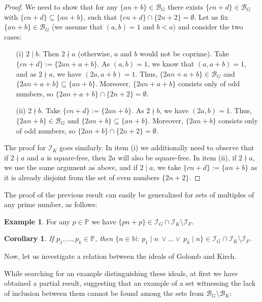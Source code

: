 \documentclass{amsart}
\newtheorem{cor}[thm]{Corollary}
\theoremstyle{definition}
\newtheorem{ex}[thm]{Example}
\newcommand{\N}{{\mathbb N}}
\newcommand{\I}{\mathcal I}
\newcommand{\B}{\mathcal{B}}
\begin{document}
\begin{proof}
We need to show that for any $\{an+b\} \in \B_G$ there exists $\{cn+d\} \in \B_G$ with $\{cn+d\} \subseteq \{an+b\}$, such that $\{cn+d\}\cap \{2n+2\} = \emptyset$. Let us fix $\{an+b\} \in \B_G$ (we assume that $(a,b)=1$ and $b<a$) and consider the two cases:
\begin{itemize}
 \item[(i)] $2\mid b$. Then $2 \nmid a$ (otherwise, $a$ and $b$ would not be coprime). Take $\{cn+d\} := \{2an+a+b\}$. As $(a,b)=1$, we know that $(a,a+b)=1$, and as $2 \nmid a$, we have $(2a,a+b)=1$. Thus, $\{2an+a+b\}\in\B_G$ and $\{2an+a+b\}\subseteq\{an+b\}$. Moreover, $\{2an+a+b\}$ consists only of odd numbers, so $\{2an+a+b\}\cap \{2n+2\} = \emptyset$.
 \item[(ii)] $2\nmid b$. Take $\{cn+d\} := \{2an+b\}$. As $2\nmid b$, we have $(2a,b)=1$. Thus, $\{2an+b\}\in\B_G$ and $\{2an+b\}\subseteq\{an+b\}$. Moreover, $\{2an+b\}$ consists only of odd numbers, so $\{2an+b\}\cap \{2n+2\} = \emptyset$.
\end{itemize}

The proof for $\I_K$ goes similarly. In item (i) we additionally need to observe that if $2 \nmid a$ and $a$ is square-free, then $2a$ will also be square-free. In item (ii), if $2 \nmid a$, we use the same argument as above, and if $2\mid a$, we take $\{cn+d\} := \{an+b\}$ as it is already disjoint from the set of even numbers $\{2n+2\}$.
\end{proof}

The proof of the previous result can easily be generalized for sets of multiples of any prime number, as follows:

\begin{ex} 
For any $p\in\mathbb{P}$ we have $\{pn+p\}\in \I_G \cap \I_K \setminus \I_F$.
\end{ex}

\begin{cor}
If $p_1, \ldots, p_k \in \mathbb{P}$, then $\{n\in\N :\ p_1\mid n\ \vee \ldots \vee\ p_k\mid n\}\in \I_G \cap \I_K \setminus \I_F$.
\end{cor}

Now, let us investigate a relation between the ideals of Golomb and Kirch.

While searching for an example distinguishing these ideals, at first we have obtained a partial result, suggesting that an example of a set witnessing the lack of inclusion between them cannot be found among the sets from $\B_G \setminus \B_K$:
\end{document}
